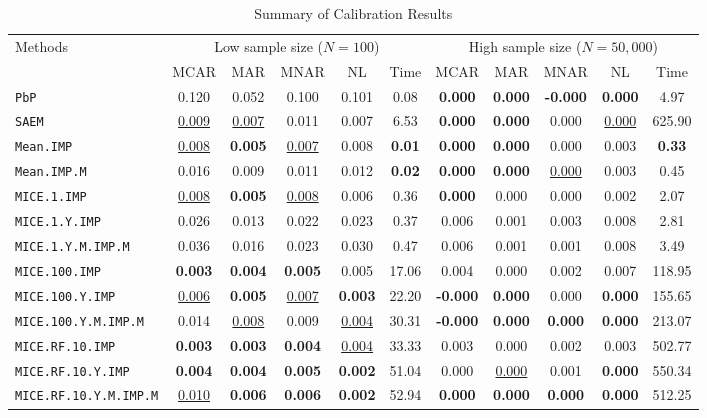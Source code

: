 \begin{table}[h!]
\centering
\begin{tabular}{l cccc c cccc c}
\toprule
\multirow{2}{*}{Methods}
& \multicolumn{5}{c}{Low sample size ($N=100$)} & \multicolumn{5}{c}{High sample size ($N=50,000$)} \\
\cmidrule(lr){2-6} \cmidrule(lr){7-11}
& MCAR & MAR & MNAR & NL & Time & MCAR & MAR & MNAR & NL & Time \\
\midrule
\texttt{PbP} & 0.120 & 0.052 & 0.100 & 0.101 & 0.08 & \textbf{0.000} & \textbf{0.000} & \textbf{-0.000} & \textbf{0.000} & 4.97 \\
\texttt{SAEM} & \underline{0.009} & \underline{0.007} & 0.011 & 0.007 & 6.53 & \textbf{0.000} & \textbf{0.000} & 0.000 & \underline{0.000} & 625.90 \\
\texttt{Mean.IMP} & \underline{0.008} & \textbf{0.005} & \underline{0.007} & 0.008 & \textbf{0.01} & \textbf{0.000} & \textbf{0.000} & 0.000 & 0.003 & \textbf{0.33} \\
\texttt{Mean.IMP.M} & 0.016 & 0.009 & 0.011 & 0.012 & \textbf{0.02} & \textbf{0.000} & \textbf{0.000} & \underline{0.000} & 0.003 & 0.45 \\
\texttt{MICE.1.IMP} & \underline{0.008} & \textbf{0.005} & \underline{0.008} & 0.006 & 0.36 & \textbf{0.000} & 0.000 & 0.000 & 0.002 & 2.07 \\
\texttt{MICE.1.Y.IMP} & 0.026 & 0.013 & 0.022 & 0.023 & 0.37 & 0.006 & 0.001 & 0.003 & 0.008 & 2.81 \\
\texttt{MICE.1.Y.M.IMP.M} & 0.036 & 0.016 & 0.023 & 0.030 & 0.47 & 0.006 & 0.001 & 0.001 & 0.008 & 3.49 \\
\texttt{MICE.100.IMP} & \textbf{0.003} & \textbf{0.004} & \textbf{0.005} & 0.005 & 17.06 & 0.004 & 0.000 & 0.002 & 0.007 & 118.95 \\
\texttt{MICE.100.Y.IMP} & \underline{0.006} & \textbf{0.005} & \underline{0.007} & \textbf{0.003} & 22.20 & \textbf{-0.000} & \textbf{0.000} & 0.000 & \textbf{0.000} & 155.65 \\
\texttt{MICE.100.Y.M.IMP.M} & 0.014 & \underline{0.008} & 0.009 & \underline{0.004} & 30.31 & \textbf{-0.000} & \textbf{0.000} & \textbf{0.000} & \textbf{0.000} & 213.07 \\
\texttt{MICE.RF.10.IMP} & \textbf{0.003} & \textbf{0.003} & \textbf{0.004} & \underline{0.004} & 33.33 & 0.003 & 0.000 & 0.002 & 0.003 & 502.77 \\
\texttt{MICE.RF.10.Y.IMP} & \textbf{0.004} & \textbf{0.004} & \textbf{0.005} & \textbf{0.002} & 51.04 & 0.000 & \underline{0.000} & 0.001 & \textbf{0.000} & 550.34 \\
\texttt{MICE.RF.10.Y.M.IMP.M} & \underline{0.010} & \textbf{0.006} & \textbf{0.006} & \textbf{0.002} & 52.94 & \textbf{0.000} & \textbf{0.000} & \textbf{0.000} & \textbf{0.000} & 512.25 \\
\bottomrule
\end{tabular}
\caption{Summary of Calibration Results}
\label{tab:calibration_summary}
\end{table}
